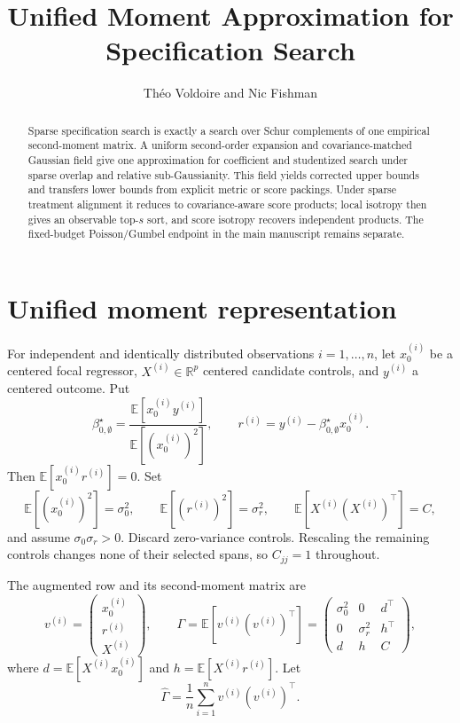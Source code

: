\documentclass[a4paper,11pt,english]{article}
\title{Unified Moment Approximation for Specification Search}
\author{Th\'eo Voldoire and Nic Fishman}
\date{}
\newcommand{\E}{\mathbb E}
\newcommand{\R}{\mathbb R}
\begin{document}
\maketitle

\begin{abstract}
Sparse specification search is exactly a search over Schur complements
of one empirical second-moment matrix.  A uniform second-order expansion
and covariance-matched Gaussian field give one approximation for
coefficient and studentized search under sparse overlap and relative
sub-Gaussianity.  This field yields corrected upper bounds and transfers
lower bounds from explicit metric or score packings.  Under sparse
treatment alignment it reduces to covariance-aware score products;
local isotropy then gives an observable top-$s$ sort, and score isotropy
recovers independent products.  The fixed-budget Poisson/Gumbel endpoint
in the main manuscript remains separate.
\end{abstract}

\section{Unified moment representation}

For independent and identically distributed observations
$i=1,\ldots,n$, let $x_0^{(i)}$ be a centered focal regressor,
$X^{(i)}\in\R^p$ centered candidate controls, and
$y^{(i)}$ a centered outcome.  Put
\begin{equation*}
        \beta_{0,\emptyset}^\star=\frac{\E[x_0^{(i)}y^{(i)}]}{\E[(x_0^{(i)})^2]},
        \qquad
        r^{(i)}=y^{(i)}-\beta_{0,\emptyset}^\star x_0^{(i)}.
\end{equation*}
Then $\E[x_0^{(i)}r^{(i)}]=0$.  Set
\begin{equation*}
        \E[(x_0^{(i)})^2]=\sigma_0^2,
        \qquad
        \E[(r^{(i)})^2]=\sigma_r^2,
        \qquad
        \E[X^{(i)}(X^{(i)})^\top]=C,
\end{equation*}
and assume $\sigma_0\sigma_r>0$.  Discard zero-variance controls.
Rescaling the remaining controls changes none of their selected spans, so
$C_{jj}=1$ throughout.

The augmented row and its second-moment matrix are
\begin{equation}\label{eq:moment-matrix}
        v^{(i)}=
        \begin{pmatrix}x_0^{(i)}\\ r^{(i)}\\ X^{(i)}\end{pmatrix},
        \qquad
        \Gamma=\E[v^{(i)}(v^{(i)})^\top]
        =\begin{pmatrix}
        \sigma_0^2&0&d^\top\\
        0&\sigma_r^2&h^\top\\
        d&h&C
        \end{pmatrix},
\end{equation}
where $d=\E[X^{(i)}x_0^{(i)}]$ and $h=\E[X^{(i)}r^{(i)}]$.  Let
\begin{equation}\label{eq:empirical-moment-matrix}
        \hat\Gamma
        =\frac1n\sum_{i=1}^n v^{(i)}(v^{(i)})^\top.
\end{equation}
\end{document}
